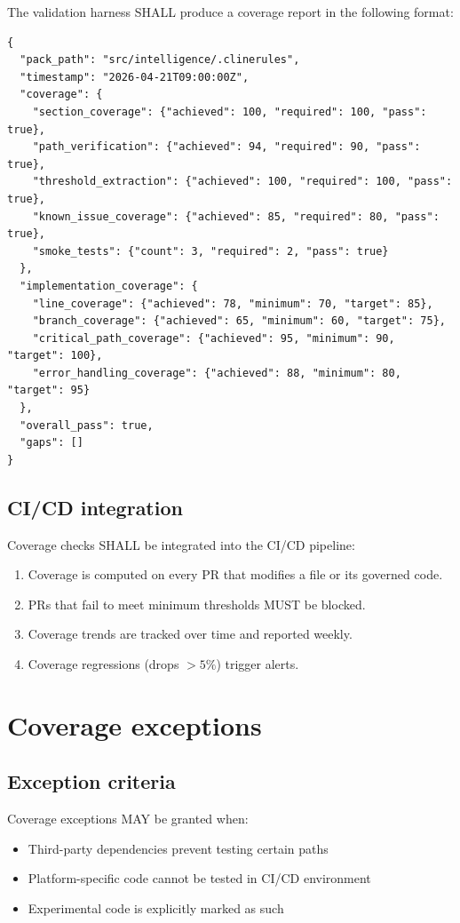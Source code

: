The validation harness SHALL produce a coverage report in the following format:

\begin{verbatim}
{
  "pack_path": "src/intelligence/.clinerules",
  "timestamp": "2026-04-21T09:00:00Z",
  "coverage": {
    "section_coverage": {"achieved": 100, "required": 100, "pass": true},
    "path_verification": {"achieved": 94, "required": 90, "pass": true},
    "threshold_extraction": {"achieved": 100, "required": 100, "pass": true},
    "known_issue_coverage": {"achieved": 85, "required": 80, "pass": true},
    "smoke_tests": {"count": 3, "required": 2, "pass": true}
  },
  "implementation_coverage": {
    "line_coverage": {"achieved": 78, "minimum": 70, "target": 85},
    "branch_coverage": {"achieved": 65, "minimum": 60, "target": 75},
    "critical_path_coverage": {"achieved": 95, "minimum": 90, "target": 100},
    "error_handling_coverage": {"achieved": 88, "minimum": 80, "target": 95}
  },
  "overall_pass": true,
  "gaps": []
}
\end{verbatim}

\subsection{CI/CD integration}

Coverage checks SHALL be integrated into the CI/CD pipeline:

\begin{enumerate}
  \item Coverage is computed on every PR that modifies a 
    file or its governed code.
  \item PRs that fail to meet minimum thresholds MUST be blocked.
  \item Coverage trends are tracked over time and reported weekly.
  \item Coverage regressions (drops $> 5\%$) trigger alerts.
\end{enumerate}

\section{Coverage exceptions}

\subsection{Exception criteria}

Coverage exceptions MAY be granted when:
\begin{itemize}
  \item Third-party dependencies prevent testing certain paths
  \item Platform-specific code cannot be tested in CI/CD environment
  \item Experimental code is explicitly marked as such
\end{itemize}

